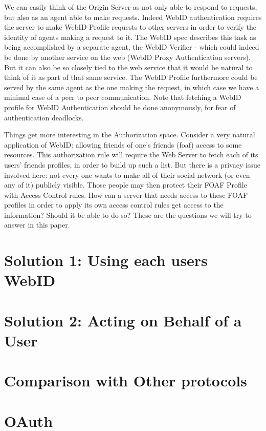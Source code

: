 \documentclass[a4paper]{llncs}
\begin{document}
We can easily think of the Origin Server as not only able to respond to requests, but also as an agent able to make requests.
Indeed WebID authentication requires the server to make WebID Profile requests to other servers in order to verify the identity of agents making a request to it.
The WebID spec describes this task as being accomplished by a separate agent, the WebID Verifier - which could indeed be done by another service on the web (WebID Proxy Authentication servers).
But it can also be so closely tied to the web service that it would be natural to think of it as part of that same service.
The WebID Profile furthermore could be served by the same agent as the one making the request, in which case we have a minimal case of a peer to peer communication.
Note that fetching a WebID profile for WebID Authentication should be done anonymously, for fear of authentication deadlocks. 

Things get more interesting in the Authorization space.
Consider a very natural application of WebID: allowing friends of one's friends (foaf) access to some resources.
This authorization rule will require the Web Server to fetch each of its users' friends profiles, in order to build up such a list.
But there is a privacy issue involved here: not every one wants to make all of their social network (or even any of it) publicly visible.
Those people may then protect their FOAF Profile with Access Control rules.
How can a server that needs access to these FOAF profiles in order to apply its own access control rules get access to the information?
Should it be able to do so?
These are the questions we will try to answer in this paper.

\section{Solution 1: Using each users WebID}

\section{Solution 2: Acting on Behalf of a User}

\section{Comparison with Other protocols}

\section{OAuth}
\end{document}
